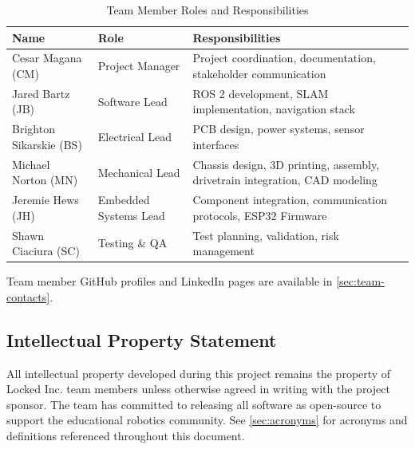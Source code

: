 \begin{table}[H]
\centering
\caption{Team Member Roles and Responsibilities}
\label{tab:team_roles}
\begin{tabular}{@{}llp{}@{}}
\toprule
\textbf{Name} & \textbf{Role} & \textbf{Responsibilities} \\
\midrule
Cesar Magana (CM) & Project Manager & Project coordination, documentation, stakeholder communication \\
Jared Bartz (JB) & Software Lead & ROS 2 development, SLAM implementation, navigation stack \\
Brighton Sikarskie (BS) & Electrical Lead & PCB design, power systems, sensor interfaces \\
Michael Norton (MN) & Mechanical Lead & Chassis design, 3D printing, assembly, drivetrain integration, CAD modeling \\
Jeremie Hews (JH) & Embedded Systems Lead & Component integration, communication protocols, ESP32 Firmware \\
Shawn Ciaciura (SC) & Testing \& QA & Test planning, validation, risk management \\
\bottomrule
\end{tabular}
\end{table}

\noindent Team member GitHub profiles and LinkedIn pages are available in \cref{sec:team-contacts}.

\subsection{Intellectual Property Statement}\label{sec:ip-statement}

All intellectual property developed during this project remains the property of Locked Inc. team members unless otherwise agreed in writing with the project sponsor. The team has committed to releasing all software as open-source to support the educational robotics community. See \cref{sec:acronyms} for acronyms and definitions referenced throughout this document.

